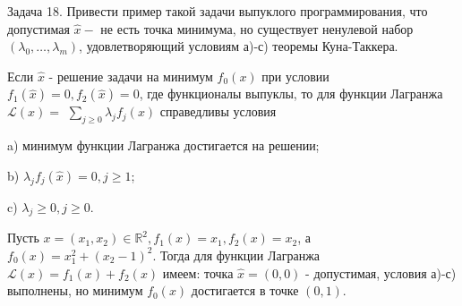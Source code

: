 \begin{task}
Задача 18. Привести пример такой задачи выпуклого программирования, что допустимая $\hat{x}-$ не есть точка минимума, но существует ненулевой набор $\left(\lambda_{0}, \ldots, \lambda_{m}\right)$, удовлетворяющий условиям а)-с) теоремы Куна-Таккера.

Если $\hat{x}$ - решение задачи на минимум $f_{0}(x)$ при условии $f_{1}(\hat{x})=0, f_{2}(\hat{x})=0$, где функционалы выпуклы, то для функции Лагранжа $\mathcal{L}(x)=$ $\sum_{j \geq 0} \lambda_{j} f_{j}(x)$ справедливы условия

a) минимум функции Лагранжа достигается на решении;

b) $\lambda_{j} f_{j}(\hat{x})=0, j \geq 1$;

c) $\lambda_{j} \geq 0, j \geq 0$.

Пусть $x=\left(x_{1}, x_{2}\right) \in \mathbb{R}^{2}, f_{1}(x)=x_{1}, f_{2}(x)=x_{2}$, а $f_{0}(x)=x_{1}^{2}+\left(x_{2}-1\right)^{2}$. Тогда для функции Лагранжа $\mathcal{L}(x)=f_{1}(x)+f_{2}(x)$ имеем: точка $\hat{x}=(0,0)$ - допустимая, условия а)-с) выполнены, но минимум $f_{0}(x)$ достигается в точке $(0,1)$.


\end{task}

